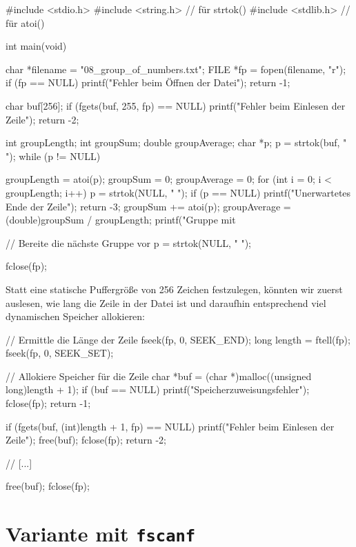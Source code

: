 \begin{codebox}[lang=c, fontsize=\small]
#include <stdio.h>
#include <string.h> // für strtok()
#include <stdlib.h> // für atoi()

int main(void) {
    char *filename = "08_group_of_numbers.txt";
    FILE *fp = fopen(filename, "r");
    if (fp == NULL) {
        printf("Fehler beim Öffnen der Datei\n");
        return -1;
    }

    char buf[256];
    if (fgets(buf, 255, fp) == NULL) {
        printf("Fehler beim Einlesen der Zeile");
        return -2;
    }

    int groupLength;
    int groupSum;
    double groupAverage;
    char *p;
    p = strtok(buf, " ");
    while (p != NULL) {
        groupLength = atoi(p);
        groupSum = 0;
        groupAverage = 0;
        for (int i = 0; i < groupLength; i++) {
            p = strtok(NULL, " ");
            if (p == NULL) {
                printf("Unerwartetes Ende der Zeile\n");
                return -3;
            }
            groupSum += atoi(p);
        }
        groupAverage = (double)groupSum / groupLength;
        printf("Gruppe mit %

        // Bereite die nächste Gruppe vor
        p = strtok(NULL, " ");
    }

    fclose(fp);
}
\end{codebox}

Statt eine statische Puffergröße von 256 Zeichen festzulegen, könnten wir zuerst
auslesen, wie lang die Zeile in der Datei ist und daraufhin entsprechend viel
dynamischen Speicher allokieren:

\begin{codebox}[lang=c, fontsize=\small]
// Ermittle die Länge der Zeile
fseek(fp, 0, SEEK_END);
long length = ftell(fp);
fseek(fp, 0, SEEK_SET);

// Allokiere Speicher für die Zeile
char *buf = (char *)malloc((unsigned long)length + 1);
if (buf == NULL) {
    printf("Speicherzuweisungsfehler\n");
    fclose(fp);
    return -1;
}

if (fgets(buf, (int)length + 1, fp) == NULL) {
    printf("Fehler beim Einlesen der Zeile\n");
    free(buf);
    fclose(fp);
    return -2;
}

// [...]

free(buf);
fclose(fp);
\end{codebox}

\section*{Variante mit \texttt{fscanf}}

